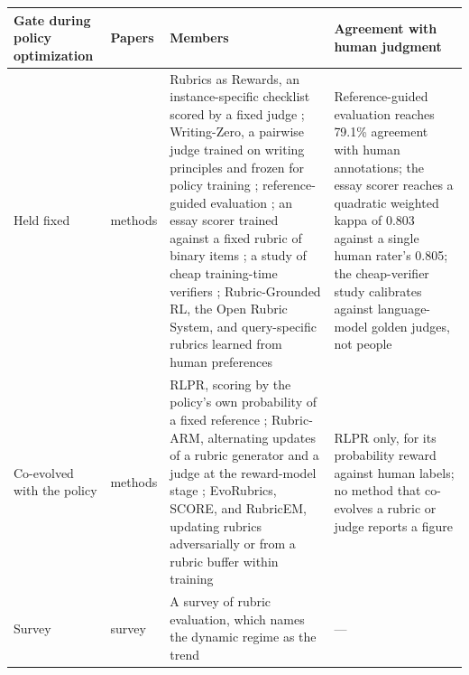 \documentclass[
  11pt,
]{article}
\newcounter{none} %
\begin{document}
{\def\LTcaptype{none} %
\begin{longtable}[]{@{}
  >{\raggedright\arraybackslash}p{}
  >{\raggedright\arraybackslash}p{}
  >{\raggedright\arraybackslash}p{}
  >{\raggedright\arraybackslash}p{}@{}}
\toprule\noalign{}
\begin{minipage}[b]{\linewidth}\raggedright
Gate during policy optimization
\end{minipage} & \begin{minipage}[b]{\linewidth}\raggedright
Papers
\end{minipage} & \begin{minipage}[b]{\linewidth}\raggedright
Members
\end{minipage} & \begin{minipage}[b]{\linewidth}\raggedright
Agreement with human judgment
\end{minipage} \\
\midrule\noalign{}
\endhead
\bottomrule\noalign{}
\endlastfoot
Held fixed & 8 methods & Rubrics as Rewards, an instance-specific checklist scored by a fixed judge \cite{gunjal2025rubrics}; Writing-Zero, a pairwise judge trained on writing principles and frozen for policy training \cite{jia2025writingzero}; reference-guided evaluation \cite{shi2026references}; an essay scorer trained against a fixed rubric of binary items \cite{jin2026rlaes}; a study of cheap training-time verifiers \cite{plesner2026cheapverifier}; Rubric-Grounded RL, the Open Rubric System, and query-specific rubrics learned from human preferences \cite{bhattarai2026rubricgrounded, jia2026openrubric, lv2026queryrubrics} & Reference-guided evaluation reaches 79.1\% agreement with human annotations; the essay scorer reaches a quadratic weighted kappa of 0.803 against a single human rater's 0.805; the cheap-verifier study calibrates against language-model golden judges, not people \\
Co-evolved with the policy & 5 methods & RLPR, scoring by the policy's own probability of a fixed reference \cite{yu2025rlpr}; Rubric-ARM, alternating updates of a rubric generator and a judge at the reward-model stage \cite{xu2026rubricarm}; EvoRubrics, SCORE, and RubricEM, updating rubrics adversarially or from a rubric buffer within training \cite{ding2026evorubrics, zhu2026score, li2026rubricem} & RLPR only, for its probability reward against human labels; no method that co-evolves a rubric or judge reports a figure \\
Survey & 1 survey & A survey of rubric evaluation, which names the dynamic regime as the trend \cite{chen2026rubricsurvey} & --- \\
\end{longtable}
}
\end{document}

